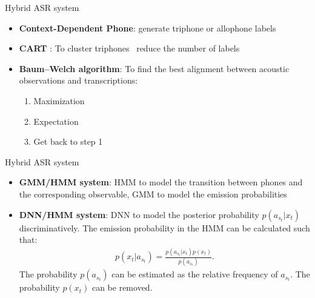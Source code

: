 \begin{frame}{Hybrid ASR system \cite{RASR-hybrid_vs_attention}}

\begin{itemize}
    \item \textbf{Context-Dependent Phone}: generate triphone or allophone labels
    
    \item \textbf{CART} \cite{Beulen98automaticquestion}: To cluster triphones \textrightarrow \, reduce the number of labels
    
    \item \textbf{Baum–Welch algorithm}: To find the best alignment between acoustic observations and transcriptions:
        \begin{enumerate}
            \item Maximization
        	\item Expectation 
        	\item Get back to step 1 
        \end{enumerate}
        
\end{itemize}
\end{frame}

\begin{frame}{Hybrid ASR system \cite{RASR-hybrid_vs_attention}}

\begin{itemize}
    \item \textbf{GMM/HMM system}: HMM to model the transition between phones and the corresponding observable, GMM to model the emission probabilities
    
    \item \textbf{DNN/HMM system}: DNN to model the posterior probability $p(a_{s_t}|x_t)$ discriminatively.
    The emission probability in the HMM can be calculated such that:
    \begin{align}
    	p(x_t|a_{s_t}) = \frac{p(a_{s_t}|x_t)p(x_t)}{p(a_{s_t})}.
    \end{align}
    The probability $p(a_{s_t})$ can be estimated as the relative frequency of $a_{s_t}$.
    The probability $p(x_t)$ can be removed.
\end{itemize}
\end{frame}


